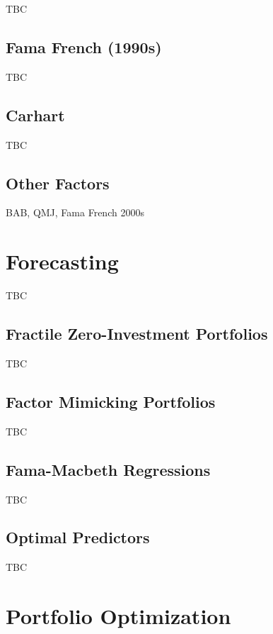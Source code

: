 \documentclass[]{book}
\theoremstyle{definition}
\theoremstyle{definition}
\theoremstyle{definition}
\theoremstyle{remark}
\begin{document}
TBC

\section{Fama French (1990s)}\label{fama-french-1990s}

TBC

\section{Carhart}\label{carhart}

TBC

\section{Other Factors}\label{other-factors}

BAB, QMJ, Fama French 2000s

\chapter{Forecasting}\label{forecasting}

TBC

\section{Fractile Zero-Investment
Portfolios}\label{fractile-zero-investment-portfolios}

TBC

\section{Factor Mimicking Portfolios}\label{factor-mimicking-portfolios}

TBC

\section{Fama-Macbeth Regressions}\label{fama-macbeth-regressions}

TBC

\section{Optimal Predictors}\label{optimal-predictors}

TBC

\chapter{Portfolio Optimization}\label{portopt}
\end{document}
